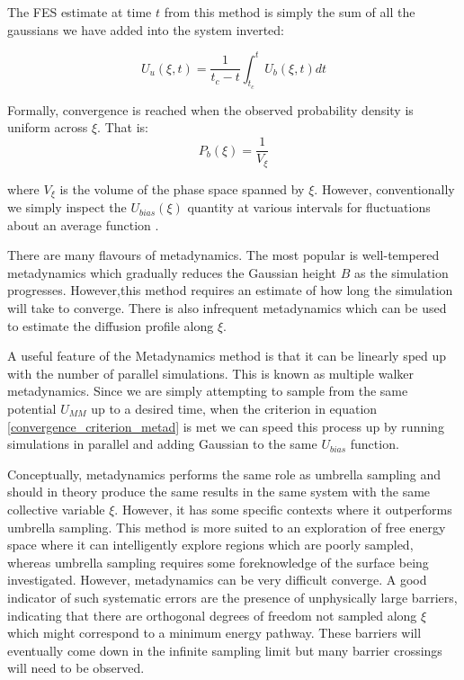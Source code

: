 The FES estimate at time $t$ from this method is simply the sum of all the gaussians we have added into the system inverted:  

\begin{equation}
	U_u (\xi,t)  =  \frac{1}{t_c-t} \int_{t_c}^t U_b(\xi,t) dt
\end{equation}

Formally, convergence is reached when the observed probability density is uniform across $\xi$. That is:
\begin{equation}
	P_b (\xi)= \frac{1}{V_\xi } 
	\label{convergence_criterion_metad}
\end{equation}

where $V_\xi$ is the volume of the phase space spanned by $\xi$. However, conventionally we simply inspect the $U_{bias}(\xi)$ quantity at various intervals for fluctuations about an average function \cite{}. 

There are many flavours of metadynamics. The most popular is well-tempered metadynamics which gradually reduces the Gaussian height $B$ as the simulation progresses\cite{barducci2008}. However,this method requires an estimate of how long the simulation will take to converge. There is also infrequent metadynamics which can be used to estimate the diffusion profile along $\xi$\cite{tiwary2013}\cite{tiwary2016}\cite{salvalaglio2014}.  

A useful feature of the Metadynamics method is that it can be linearly sped up with the number of parallel simulations. This is known as multiple walker metadynamics. Since we are simply attempting to sample from the same potential $U_{MM}$ up to a desired time, when the criterion in equation \ref{convergence_criterion_metad} is met we can speed this process up by running simulations in parallel and adding Gaussian to the same $U_{bias}$ function.

Conceptually, metadynamics performs the same role as umbrella sampling and should in theory produce the same results in the same system with the same collective variable $\xi$. However, it has some specific contexts where it outperforms umbrella sampling. This method is more suited to an exploration of free energy space where it can intelligently explore regions which are poorly sampled, whereas umbrella sampling requires some foreknowledge of the surface being investigated. However, metadynamics can be very difficult converge. A good indicator of such systematic errors are the presence of unphysically large barriers, indicating that there are orthogonal degrees of freedom not sampled along $\xi$ which might correspond to a minimum energy pathway. These barriers will eventually come down in the infinite sampling limit but many barrier crossings will need to be observed. 

